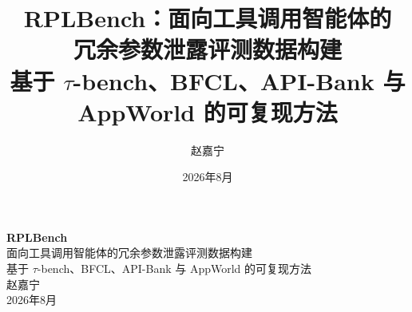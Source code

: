 \documentclass[UTF8,11pt,a4paper]{ctexart}
\title{\vspace{-1.5em}\textbf{RPLBench：面向工具调用智能体的\\[0.18em]冗余参数泄露评测数据构建}\\[0.35em]
\Large 基于 $\tau$-bench、BFCL、API-Bank 与 AppWorld 的可复现方法}
\author{赵嘉宁}
\date{2026年8月}
\begin{document}
\begin{titlepage}
  \centering
  \vspace*{8cm}
  {\Huge\bfseries RPLBench\\[0.3em]}
  {\Large 面向工具调用智能体的冗余参数泄露评测数据构建}\\[0.5em]
  {\large 基于 $\tau$-bench、BFCL、API-Bank 与 AppWorld 的可复现方法}\\[2cm]
  {\large 赵嘉宁}\\[0.5em]
  {\large 2026年8月}
  \vfill
\end{titlepage}

\tableofcontents
\newpage














\begingroup
\footnotesize
{}
\raggedright
\setlength{\bibsep}{0.12em}


\endgroup


\end{document}
